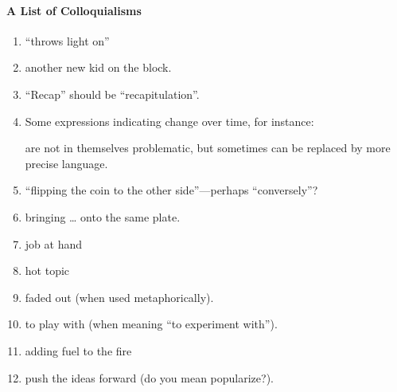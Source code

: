 \begin{scope}
\paragraph{A List of Colloquialisms}\label{sec:list-colloquialisms}
\begin{enumerate}
\item
  ``throws light on''
\item
  another new kid on the block.
\item
  ``Recap'' should be ``recapitulation''.
\item
  Some expressions indicating change over time, for instance:
  are not in themselves problematic, but sometimes can be replaced by
  more precise language.
\item
  ``flipping the coin to the other side''---perhaps ``conversely''?
\item 
  bringing \dots{} onto the same plate.
\item
  job at hand
\item
  hot topic
\item
  faded out (when used metaphorically).
\item
  to play with (when meaning ``to experiment with'').
\item
  adding fuel to the fire 
\item
  push the ideas forward (do you mean popularize?).
\end{enumerate}

\end{scope}
